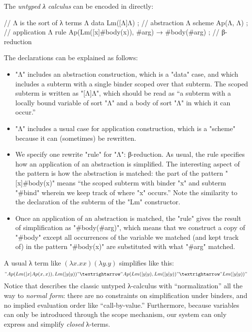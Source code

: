 \documentclass[letterpaper,11pt]{article}
\begin{document}
\begin{example}\label{ex:lambda}
  The \emph{untyped λ calculus} can be encoded in \hax directly:
  \begin{hacs}[numbers=right,texcl]
    // Λ is the sort of λ terms
    Λ  data Lm([Λ]Λ) ;                                        // abstraction
    Λ  scheme Ap(Λ, Λ) ;                                      // application
    Λ  rule Ap(Lm([x]#body(x)), #arg) →  #body(#arg) ;    // β-reduction
  \end{hacs}
  The declarations can be explained as follows:
  \begin{itemize}

  \item "Λ" includes an abstraction construction, which is a "data" case, and which includes a
    subterm with a single binder scoped over that subterm. The scoped subterm is written as
    "[Λ]Λ", which should be read as ``a subterm with a locally bound variable of sort "Λ" and a
    body of sort "Λ" in which it can occur.''

  \item "Λ" includes a usual case for application construction, which is a "scheme" because it
    can (sometimes) be rewritten.

  \item We specify one rewrite "rule" for "Λ": β-reduction. As usual, the rule specifies how an
    application of an abstraction is simplified. The interesting aspect of the pattern is how the
    abstraction is matched: the part of the pattern "[x]#body(x)" means ``the scoped subterm with
    binder "x" and subterm "#bind" wherein we keep track of where "x" occurs.'' Note the similarity
    to the declaration of the subterm of the "Lm" constructor.

  \item Once an application of an abstraction is matched, the "rule" gives the result of
    simplification as "#body(#arg)", which means that we construct a copy of "#body" except all
    occurrences of the variable we matched (and kept track of) in the pattern "#body(x)" are
    substituted with what "#arg" matched.


  \end{itemize}
  A usual λ term like $(λx.x x)(λy.y)$ simplifies like this:
  \begin{displaymath}
    "Ap(Lm([x]Ap(x, x)), Lm([y]y))" →
    "Ap(Lm([y]y), Lm([y]y))" →
    "Lm([y]y))"
  \end{displaymath}
  Notice that \hax describes the classic untyped λ-calculus with ``normalization'' all the way to
  \emph{normal form}: there are no constraints on simplification under binders, and no implied
  evaluation order like ``call-by-value.'' Furthermore, because variables can only be introduced
  through the scope mechanism, our system can only express and simplify \emph{closed} λ-terms.
\end{example}
\end{document}
